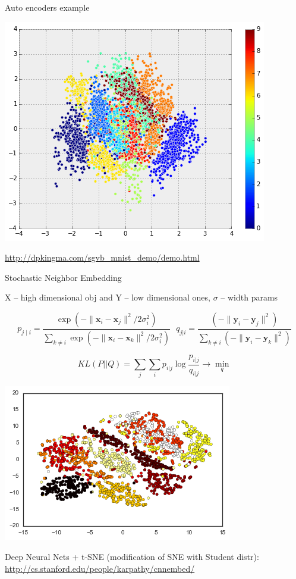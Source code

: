\documentclass{beamer}
\begin{document}
\begin{frame}{Auto encoders example}
		 \begin{center}
		 	 \includegraphics[scale=0.4]{img/autoenc}
		 \end{center}
	
	 \href{http://dpkingma.com/sgvb_mnist_demo/demo.html}{http://dpkingma.com/sgvb\_mnist\_demo/demo.html}
\end{frame}

\begin{frame}{Stochastic Neighbor Embedding}
	
	  X -- high dimensional obj and Y -- low dimensional ones, $\sigma$ -- width params
	
	$$ p_{j\mid i} = \frac{\exp(-\lVert\mathbf{x}_i - \mathbf{x}_j\rVert^2 / 2\sigma_i^2)}{\sum_{k \neq i} \exp(-\lVert\mathbf{x}_i - \mathbf{x}_k\rVert^2 / 2\sigma_i^2)}~~~ q_{j|i} = \frac{(-\lVert \mathbf{y}_i - \mathbf{y}_j\rVert^2)}{\sum_{k \neq i} (-\lVert \mathbf{y}_i - \mathbf{y}_k\rVert^2)}$$
	 
	\vspace{-0.1cm}
	$$KL(P||Q) = \sum_j\sum_{i} p_{i|j} \log \frac{p_{i|j}}{q_{i|j}} \rightarrow \min_q$$
	
	 \begin{center}
		 	 \includegraphics[scale=0.4]{img/tsne_mnist}
	 \end{center}
	
	Deep Neural Nets + t-SNE (modification of SNE with Student distr): \href{http://cs.stanford.edu/people/karpathy/cnnembed/}{http://cs.stanford.edu/people/karpathy/cnnembed/}
\end{frame}
\end{document}
